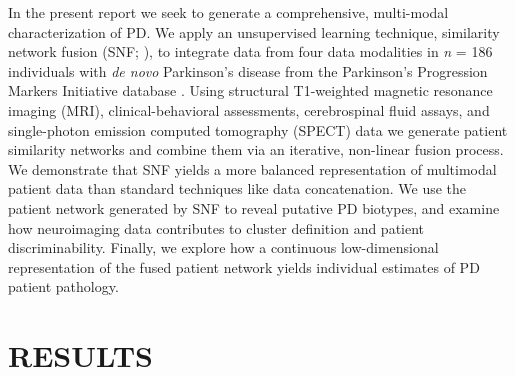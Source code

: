 \documentclass[12pt,aps,pra,reprint,showkeys]{revtex4-1}
\begin{document}
In the present report we seek to generate a comprehensive, multi-modal characterization of PD.
We apply an unsupervised learning technique, similarity network fusion (SNF; \citep{wang2014similarity}), to integrate data from four data modalities in \emph{n} = 186 individuals with \emph{de novo} Parkinson's disease from the Parkinson's Progression Markers Initiative database \citep{marek2011progneurobiol}.
Using structural T1-weighted magnetic resonance imaging (MRI), clinical-behavioral assessments, cerebrospinal fluid assays, and single-photon emission computed tomography (SPECT) data we generate patient similarity networks and combine them via an iterative, non-linear fusion process.
We demonstrate that SNF yields a more balanced representation of multimodal patient data than standard techniques like data concatenation.
We use the patient network generated by SNF to reveal putative PD biotypes, and examine how neuroimaging data contributes to cluster definition and patient discriminability.
Finally, we explore how a continuous low-dimensional representation of the fused patient network yields individual estimates of PD patient pathology.

\section*{RESULTS}
\end{document}
